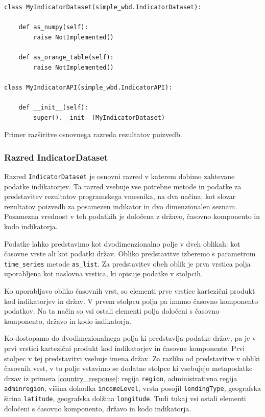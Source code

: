 \begin{snippet}
\begin{center}
\begin{lstlisting}
class MyIndicatorDataset(simple_wbd.IndicatorDataset):
    
    def as_numpy(self):
        raise NotImplemented()
    
    def as_orange_table(self):
        raise NotImplemented()

class MyIndicatorAPI(simple_wbd.IndicatorAPI):

    def __init__(self):
        super().__init__(MyIndicatorDataset)
\end{lstlisting}
\end{center}
\caption[some]{Primer razširitve osnovnega razreda rezultatov poizvedb.}
\label{indicator_api_extend}
\end{snippet} 


\subsubsection{Razred IndicatorDataset}

Razred \verb|IndicatorDataset| je osnovni razred v katerem dobimo zahtevane 
podatke indikatorjev. Ta razred vsebuje vse potrebne metode in podatke za 
predstavitev rezultatov programskega vmesnika, na dva načina: kot slovar
rezultatov poizvedb za posamezen indikator in dvo dimenzionalen seznam. 
Posamezna vrednost v teh podatkih je določena z državo, časovno komponento in 
kodo indikatorja. 

Podatke lahko predstavimo kot dvodimenzionalno polje v dveh oblikah: kot
časovne vrste ali kot podatki držav. Obliko predstavitve izberemo s
parametrom \verb|time_series| metode \verb|as_list|. Za predstavitev obeh oblik
je prva vrstica polja uporabljena kot naslovna vrstica, ki opisuje podatke v 
stolpcih.

Ko uporabljavo obliko časovnih vrst, so elementi prve vrstice kartezični
produkt kod indikatorjev in držav. V prvem stolpcu polja pa imamo časovno
komponento podatkov. Na ta način so vsi ostali elementi polja določeni s 
časovno komponento, državo in kodo indikatorja.

Ko dostopamo do dvodimezionalnega polja ki predstavlja podatke držav, pa je v
prvi vrstici kartezični produkt kod indikatorjev in časovne komponente. Prvi
stolpec v tej predstavitvi vsebuje imena držav. Za razliko od predstavitve v 
obliki časovnih vrst, v to polje vstavimo se dodatne stolpce ki vsebujejo
metapodatke drzav iz primera \ref{country_response}: regija \verb|region|, administrativna regija
\verb|adminregion|, višina dohodka \verb|incomeLevel|, vrsta posojil
\verb|lendingType|, geografska širina \verb|latitude|, geografska dolžina
\verb|longitude|. Tudi tukaj vsi ostali elementi določeni s časovno 
komponento, državo in kodo indikatorja. 

